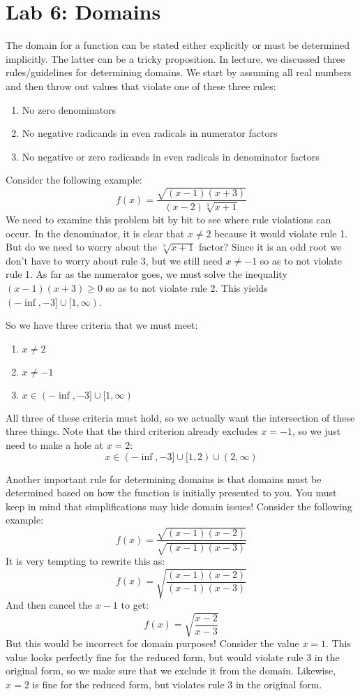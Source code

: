 \documentclass[letterpaper,12pt,fleqn]{article}
\begin{document}
\section*{Lab 6: Domains}

The domain for a function can be stated either explicitly or must be determined
implicitly. The latter can be a tricky proposition. In lecture, we discussed
three rules/guidelines for determining domains. We start by assuming all real
numbers and then throw out values that violate one of these three rules:
\begin{enumerate}
\item No zero denominators
\item No negative radicands in even radicals in numerator factors
\item No negative or zero radicands in even radicals in denominator factors
\end{enumerate}
Consider the following example:
\[f(x)=\frac{\sqrt{(x-1)(x+3)}}{(x-2)\sqrt[3]{x+1}}\]
We need to examine this problem bit by bit to see where rule violations can
occur. In the denominator, it is clear that $x\ne2$ because it would violate
rule 1. But do we need to worry about the $\sqrt[3]{x+1}$ factor? Since it is
an odd root we don't have to worry about rule 3, but we still need $x\ne-1$ so
as to not violate rule 1. As far as the numerator goes, we must solve the
inequality $(x-1)(x+3)\ge0$ so as to not violate rule 2. This yields
$(-\inf,-3]\cup[1,\infty)$.

So we have three criteria that we must meet:
\begin{enumerate}
\item $x\ne2$
\item $x\ne-1$
\item $x\in(-\inf,-3]\cup[1,\infty)$
\end{enumerate}
All three of these criteria must hold, so we actually want the intersection
of these three things. Note that the third criterion already excludes $x=-1$,
so we just need to make a hole at $x=2$:
\[x\in(-\inf,-3]\cup[1,2)\cup(2,\infty)\]

Another important rule for determining domains is that domains must be
determined based on how the function is initially presented to you. You must
keep in mind that simplifications may hide domain issues! Consider the
following example:
\[f(x)=\frac{\sqrt{(x-1)(x-2)}}{\sqrt{(x-1)(x-3)}}\]
It is very tempting to rewrite this as:
\[f(x)=\sqrt{\frac{(x-1)(x-2)}{(x-1)(x-3)}}\]
And then cancel the $x-1$ to get:
\[f(x)=\sqrt{\frac{x-2}{x-3}}\]
But this would be incorrect for domain purposes! Consider the value $x=1$.
This value looks perfectly fine for the reduced form, but would violate
rule 3 in the original form, so we make sure that we exclude it from the
domain. Likewise, $x=2$ is fine for the reduced form, but violates rule 3 in
the original form.
\end{document}
